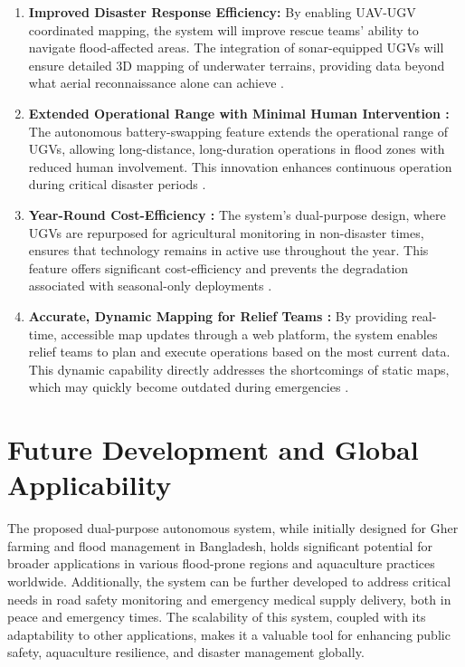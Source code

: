 \documentclass[conference]{IEEEtran}
\begin{document}
\begin{enumerate}
	\item \textbf{Improved Disaster Response Efficiency: } 
	By enabling UAV-UGV coordinated mapping, the system will improve rescue teams' ability to navigate flood-affected areas. The integration of sonar-equipped UGVs will ensure detailed 3D mapping of underwater terrains, providing data beyond what aerial reconnaissance alone can achieve \cite{ref3}.

	\item \textbf{Extended Operational Range with Minimal Human Intervention :}
The autonomous battery-swapping feature extends the operational range of UGVs, allowing long-distance, long-duration operations in flood zones with reduced human involvement. This innovation enhances continuous operation during critical disaster periods \cite{ref4}.
	
	\item \textbf{Year-Round Cost-Efficiency : }
The system’s dual-purpose design, where UGVs are repurposed for agricultural monitoring in non-disaster times, ensures that technology remains in active use throughout the year. This feature offers significant cost-efficiency and prevents the degradation associated with seasonal-only deployments \cite{ref6}.
	
	\item \textbf{Accurate, Dynamic Mapping for Relief Teams : }
By providing real-time, accessible map updates through a web platform, the system enables relief teams to plan and execute operations based on the most current data. This dynamic capability directly addresses the shortcomings of static maps, which may quickly become outdated during emergencies \cite{ref7}.
		
\end{enumerate}


\section{\textbf{Future Development and Global Applicability}}
The proposed dual-purpose autonomous system, while initially designed for Gher farming and flood management in Bangladesh, holds significant potential for broader applications in various flood-prone regions and aquaculture practices worldwide. Additionally, the system can be further developed to address critical needs in road safety monitoring and emergency medical supply delivery, both in peace and emergency times. The scalability of this system, coupled with its adaptability to other applications, makes it a valuable tool for enhancing public safety, aquaculture resilience, and disaster management globally.
\end{document}
